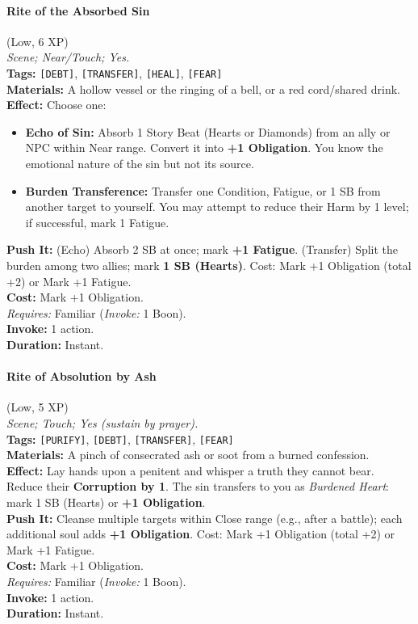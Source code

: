 \paragraph{Rite of the Absorbed Sin} (Low, 6 XP) \hfill \\
\emph{Scene; Near/Touch; Yes.} \\
\textbf{Tags:} \texttt{[DEBT]}, \texttt{[TRANSFER]}, \texttt{[HEAL]}, \texttt{[FEAR]} \\
\textbf{Materials:} A hollow vessel or the ringing of a bell, or a red cord/shared drink. \\
\textbf{Effect:} Choose one:
\begin{itemize}
  \item \textbf{Echo of Sin:} Absorb 1 Story Beat (Hearts or Diamonds) from an ally or NPC within Near range. Convert it into \textbf{+1 Obligation}. You know the emotional nature of the sin but not its source.
  \item \textbf{Burden Transference:} Transfer one Condition, Fatigue, or 1 SB from another target to yourself. You may attempt to reduce their Harm by 1 level; if successful, mark 1 Fatigue.
\end{itemize}
\textbf{Push It:} (Echo) Absorb 2 SB at once; mark \textbf{+1 Fatigue}. (Transfer) Split the burden among two allies; mark \textbf{1 SB (Hearts)}. Cost: Mark +1 Obligation (total +2) or Mark +1 Fatigue. \\
\textbf{Cost:} Mark +1 Obligation. \\
\textit{Requires:} Familiar (\textit{Invoke:} 1 Boon). \\
\textbf{Invoke:} 1 action. \\
\textbf{Duration:} Instant.

\paragraph{Rite of Absolution by Ash} (Low, 5 XP) \hfill \\
\emph{Scene; Touch; Yes (sustain by prayer).} \\
\textbf{Tags:} \texttt{[PURIFY]}, \texttt{[DEBT]}, \texttt{[TRANSFER]}, \texttt{[FEAR]} \\
\textbf{Materials:} A pinch of consecrated ash or soot from a burned confession. \\
\textbf{Effect:} Lay hands upon a penitent and whisper a truth they cannot bear. Reduce their \textbf{Corruption by 1}. The sin transfers to you as \textit{Burdened Heart}: mark 1 SB (Hearts) or \textbf{+1 Obligation}. \\
\textbf{Push It:} Cleanse multiple targets within Close range (e.g., after a battle); each additional soul adds \textbf{+1 Obligation}. Cost: Mark +1 Obligation (total +2) or Mark +1 Fatigue. \\
\textbf{Cost:} Mark +1 Obligation. \\
\textit{Requires:} Familiar (\textit{Invoke:} 1 Boon). \\
\textbf{Invoke:} 1 action. \\
\textbf{Duration:} Instant.

